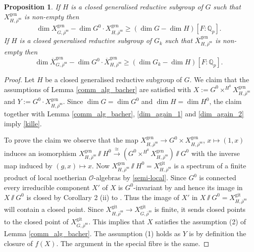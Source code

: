 \documentclass{amsart}
\newtheorem{prop}{Proposition}[section]
\theoremstyle{definition}
\theoremstyle{remark}
\newcommand{\Qp}{\mathbb {Q}_p}
\newcommand{\OO}{\mathcal O}
\newcommand{\rhobar}{\overline{\rho}}
\newcommand{\gen}{\mathrm{gen}}
\newcommand{\gps}{\mathrm{git}}
\newcommand{\Xbar}{\overline{X}}
\newcommand{\rhobarss}{\rhobar^{\mathrm{ss}}}
\begin{document}
\begin{prop}\label{Benediktiner} If $H$ is a closed generalised reductive subgroup of $G$ such that $X^{\gen}_{H, \rhobarss}$ is non-empty then 
\begin{equation}\label{kille}
\dim X^{\gen}_{G, \rhobarss} - \dim G^0\cdot X^{\gen}_{H, \rhobarss} \ge (\dim G - \dim H) [F:\Qp].
\end{equation}
If $H$ is a closed generalised reductive subgroup of $G_k$ such that $\Xbar^{\gen}_{H, \rhobarss}$ is non-empty then 
\begin{equation}\label{pitsch}
 \dim \Xbar^{\gen}_{G, \rhobarss} - \dim G^0\cdot \Xbar^{\gen}_{H, \rhobarss} \ge (\dim G_k - \dim H) [F:\Qp].
 \end{equation}
\end{prop}
\begin{proof} Let $H$ be a closed generalised reductive subgroup of $G$. We claim that the assumptions 
of Lemma \ref{comm_alg_bacher} are satisfied with $X:= G^0\times^{H^0} X^{\gen}_{H, \rhobarss}$
and $Y:= G^0\cdot X^{\gen}_{H, \rhobarss}$. Since $\dim G=\dim G^0$ and $\dim H=\dim H^0$, the claim together with Lemma \ref{comm_alg_bacher}, \eqref{dim_again_1} and \eqref{dim_again_2} imply \eqref{kille}.

To prove the claim we observe that the map $X^{\gen}_{H, \rhobarss} \rightarrow G^0\times X^{\gen}_{H, \rhobarss}$, $x\mapsto (1,x)$
induces an isomorphism  
$ X^{\gen}_{H, \rhobarss}\sslash H^0 \overset{\cong}{\longrightarrow} (G^0\times^{H^0} X^{\gen}_{H, \rhobarss})\sslash G^0$
with the inverse map induced by $(g, x)\mapsto x$. Now $X^{\gen}_{H, \rhobarss}\sslash H^0= X^{\gps}_{H, \rhobarss}$ is a spectrum of a finite product of local noetherian $\OO$-algebras by \eqref{semi-local}. 
Since $G^0$ is connected every irreducible component $X'$ of $X$ is $G^0$-invariant by \cite[Lemma 2.1]{BIP_new}
and hence its image in $X\sslash G^0$ is closed by Corollary 2 (ii) to \cite[Proposition 9]{seshadri}. 
Thus the image of $X'$ in $X\sslash G^0=X^{\gps}_{H, \rhobarss}$ will contain a closed point. 
Since $X^{\gps}_{H, \rhobarss} \rightarrow X^{\gps}_{G, \rhobarss}$ is finite, it sends closed
points to the closed point of $X^{\gps}_{G, \rhobarss}$. This implies that $X$ satisfies the assumption 
(2) of Lemma \ref{comm_alg_bacher}. The assumption (1) holds as $Y$ is by definition 
the closure of $f(X)$. The argument in the special fibre is the same. 
\end{proof}
\end{document}

